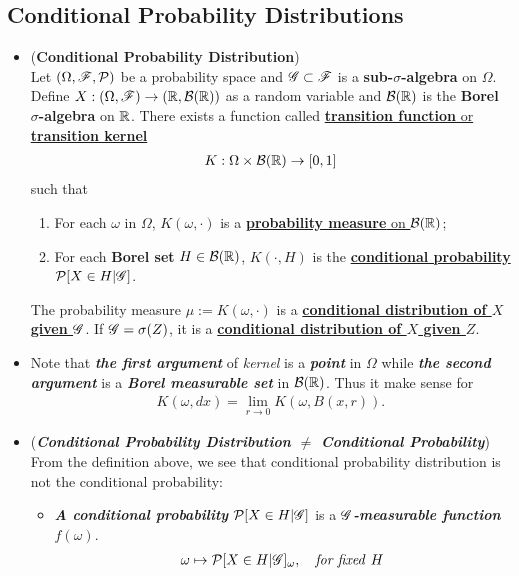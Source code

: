 \documentclass[11pt]{article}
\begin{document}
\subsection{Conditional Probability Distributions}
\begin{itemize}
\item 
\begin{proposition} \label{prop: cond_prob_dist} (\textbf{Conditional Probability Distribution}) \citep{billingsley2008probability}\\
Let  $(\Omega,  {\mathscr F},  {\mathcal P})$ be a probability space and  ${\mathscr G} \subset {\mathscr F}$ is a \textbf{sub-$\sigma$-algebra} on $\Omega$. Define $X: (\Omega, {\mathscr F}) \rightarrow ({\mathbb R}, {\mathcal B}({\mathbb R}))$ as a random variable and ${\mathcal B}({\mathbb R})$ is the \textbf{Borel $\sigma$-algebra} on ${\mathbb R}$. There exists a function called \underline{\textbf{transition function} or \textbf{transition kernel}} 
\begin{align*}
K: \Omega \times  {\mathcal B}({\mathbb R})  \rightarrow [0, 1]
\end{align*}
 such that
\begin{enumerate}
\item For each $\omega$ in $\Omega$, $K(\omega, \cdot)$ is a \underline{\textbf{probability measure} on ${\mathcal B}({\mathbb R})$};
\item For each \textbf{Borel set} $H\in {\mathcal B}({\mathbb R})$, $K(\cdot, H)$ is the \underline{\textbf{conditional probability} ${\mathcal P}[X \in H | {\mathscr G}]$}.
\end{enumerate}
The probability measure $\mu := K(\omega, \cdot)$ is a \underline{\textbf{conditional distribution of $X$ given ${\mathscr G}$}}.
If ${\mathscr G} = \sigma(Z)$, it is a \underline{\textbf{conditional distribution of $X$ given $Z$}}.
\end{proposition}

\item \begin{remark}
Note that \emph{\textbf{the first argument}} of \emph{kernel} is a \emph{\textbf{point}} in $\Omega$ while \emph{\textbf{the second argument}} is a \emph{\textbf{Borel measurable set}} in ${\mathcal B}({\mathbb R})$. Thus it make sense for 
\begin{align*}
K(\omega, dx) = \lim\limits_{r \rightarrow 0 }K(\omega, B(x, r)).
\end{align*}
\end{remark}

\item \begin{remark} (\textbf{\emph{Conditional Probability Distribution $\neq$ Conditional Probability}})\\
From the definition above, we see that conditional probability distribution is not the conditional probability:
\begin{itemize}
\item \emph{\textbf{A conditional probability}} ${\mathcal P}[X \in H | {\mathscr G}]$ is a \emph{\textbf{${\mathscr G}$-measurable function}} $f(\omega)$.
\begin{align*}
 \omega \mapsto {\mathcal P}[X \in H | {\mathscr G}]_{\omega}, \quad \text{\emph{for fixed }}H
\end{align*}


\end{itemize}
\end{remark}
\end{itemize}
\end{document}
